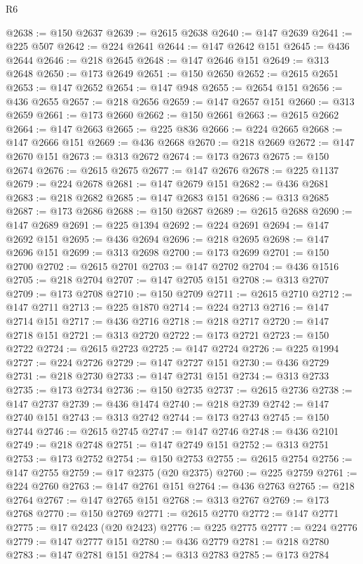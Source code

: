 \begin{lexlean}{R6}
\begin{coremodule}
@2638 := @150 @2637
@2639 := @2615 @2638
@2640 := @147 @2639
@2641 := @225 @507
@2642 := @224 @2641
@2644 := @147 @2642 @151
@2645 := @436 @2644
@2646 := @218 @2645
@2648 := @147 @2646 @151
@2649 := @313 @2648
@2650 := @173 @2649
@2651 := @150 @2650
@2652 := @2615 @2651
@2653 := @147 @2652
@2654 := @147 @948
@2655 := @2654 @151
@2656 := @436 @2655
@2657 := @218 @2656
@2659 := @147 @2657 @151
@2660 := @313 @2659
@2661 := @173 @2660
@2662 := @150 @2661
@2663 := @2615 @2662
@2664 := @147 @2663
@2665 := @225 @836
@2666 := @224 @2665
@2668 := @147 @2666 @151
@2669 := @436 @2668
@2670 := @218 @2669
@2672 := @147 @2670 @151
@2673 := @313 @2672
@2674 := @173 @2673
@2675 := @150 @2674
@2676 := @2615 @2675
@2677 := @147 @2676
@2678 := @225 @1137
@2679 := @224 @2678
@2681 := @147 @2679 @151
@2682 := @436 @2681
@2683 := @218 @2682
@2685 := @147 @2683 @151
@2686 := @313 @2685
@2687 := @173 @2686
@2688 := @150 @2687
@2689 := @2615 @2688
@2690 := @147 @2689
@2691 := @225 @1394
@2692 := @224 @2691
@2694 := @147 @2692 @151
@2695 := @436 @2694
@2696 := @218 @2695
@2698 := @147 @2696 @151
@2699 := @313 @2698
@2700 := @173 @2699
@2701 := @150 @2700
@2702 := @2615 @2701
@2703 := @147 @2702
@2704 := @436 @1516
@2705 := @218 @2704
@2707 := @147 @2705 @151
@2708 := @313 @2707
@2709 := @173 @2708
@2710 := @150 @2709
@2711 := @2615 @2710
@2712 := @147 @2711
@2713 := @225 @1870
@2714 := @224 @2713
@2716 := @147 @2714 @151
@2717 := @436 @2716
@2718 := @218 @2717
@2720 := @147 @2718 @151
@2721 := @313 @2720
@2722 := @173 @2721
@2723 := @150 @2722
@2724 := @2615 @2723
@2725 := @147 @2724
@2726 := @225 @1994
@2727 := @224 @2726
@2729 := @147 @2727 @151
@2730 := @436 @2729
@2731 := @218 @2730
@2733 := @147 @2731 @151
@2734 := @313 @2733
@2735 := @173 @2734
@2736 := @150 @2735
@2737 := @2615 @2736
@2738 := @147 @2737
@2739 := @436 @1474
@2740 := @218 @2739
@2742 := @147 @2740 @151
@2743 := @313 @2742
@2744 := @173 @2743
@2745 := @150 @2744
@2746 := @2615 @2745
@2747 := @147 @2746
@2748 := @436 @2101
@2749 := @218 @2748
@2751 := @147 @2749 @151
@2752 := @313 @2751
@2753 := @173 @2752
@2754 := @150 @2753
@2755 := @2615 @2754
@2756 := @147 @2755
@2759 := @17 @2375 (@20 @2375)
@2760 := @225 @2759
@2761 := @224 @2760
@2763 := @147 @2761 @151
@2764 := @436 @2763
@2765 := @218 @2764
@2767 := @147 @2765 @151
@2768 := @313 @2767
@2769 := @173 @2768
@2770 := @150 @2769
@2771 := @2615 @2770
@2772 := @147 @2771
@2775 := @17 @2423 (@20 @2423)
@2776 := @225 @2775
@2777 := @224 @2776
@2779 := @147 @2777 @151
@2780 := @436 @2779
@2781 := @218 @2780
@2783 := @147 @2781 @151
@2784 := @313 @2783
@2785 := @173 @2784

\end{coremodule}
\end{lexlean}
